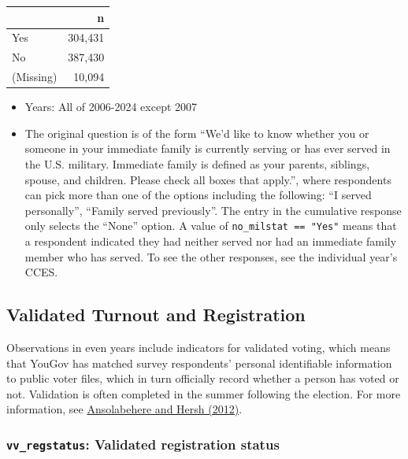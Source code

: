 \documentclass[10pt,article,oneside]{memoir}
\begin{document}
\begin{table}[H]
\centering
\begin{tabular}[t]{lr}
\toprule
 & n\\
\midrule
Yes & 304,431\\
No & 387,430\\
(Missing) & 10,094\\
\bottomrule
\end{tabular}
\end{table}

\begin{itemize}
\tightlist
\item
  Years: All of 2006-2024 except 2007
\item
  The original question is of the form ``We'd like to know whether you
  or someone in your immediate family is currently serving or has ever
  served in the U.S. military. Immediate family is defined as your
  parents, siblings, spouse, and children. Please check all boxes that
  apply.'', where respondents can pick more than one of the options
  including the following: ``I served personally'', ``Family served
  previously''. The entry in the cumulative response only selects the
  ``None'' option. A value of \texttt{no\_milstat\ ==\ "Yes"} means that
  a respondent indicated they had neither served nor had an immediate
  family member who has served. To see the other responses, see the
  individual year's CCES.
\end{itemize}

\subsection{Validated Turnout and
Registration}\label{validated-turnout-and-registration}

Observations in even years include indicators for validated voting,
which means that YouGov has matched survey respondents' personal
identifiable information to public voter files, which in turn officially
record whether a person has voted or not. Validation is often completed
in the summer following the election. For more information, see
\href{https://doi.org/10.1093/pan/mps023}{Ansolabehere and Hersh
(2012)}.

\subsubsection{\texorpdfstring{\texttt{vv\_regstatus}: Validated
registration
status}{vv\_regstatus: Validated registration status}}\label{vv_regstatus-validated-registration-status}
\end{document}
